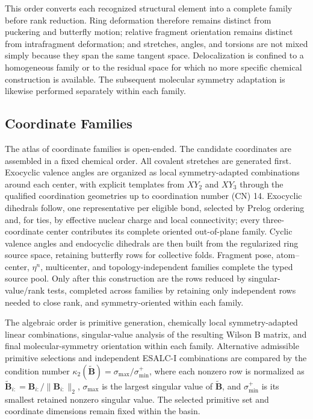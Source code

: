 \documentclass[journal=jctcce,manuscript=article,layout=traditional]{achemso}
\newcommand{\Bmat}{\mathbf{B}}
\theoremstyle{definition}
\begin{document}
This order converts each recognized structural element into a complete family
before rank reduction.  Ring deformation therefore remains distinct from
puckering and butterfly motion; relative fragment orientation remains distinct
from intrafragment deformation; and stretches, angles, and torsions are not
mixed simply because they span the same tangent space.  Delocalization is
confined to a homogeneous family or to the residual space for which no more
specific chemical construction is available.  The subsequent molecular
symmetry adaptation is likewise performed separately within each family.

\subsection{Coordinate Families}

The atlas of coordinate families is open-ended.
The candidate coordinates are assembled in a fixed chemical order.  All covalent
{stretches} are generated first.  Exocyclic valence angles are organized as
local symmetry-adapted combinations around each center, with explicit
templates from \(XY_2\) and \(XY_3\) through the qualified coordination
geometries up to coordination number (CN) 14.\cite{ZouTaoKraka2020Polytopal}  Exocyclic dihedrals follow, one representative per
eligible bond, selected by Prelog ordering and, for ties, by effective nuclear
charge and local connectivity; every three-coordinate center contributes its
complete oriented out-of-plane family.  Cyclic valence angles and endocyclic
dihedrals are then built from the regularized ring source space, retaining
butterfly rows for collective folds.  Fragment pose, atom--center, \(\eta^n\), multicenter, and
topology-independent families complete the typed source pool.  Only after this
construction are the rows reduced by singular-value/rank tests, completed
across families by retaining only independent rows needed to close rank, and
symmetry-oriented within each family.

{The algebraic order is primitive generation, chemically local
symmetry-adapted linear combinations, singular-value analysis of the resulting
Wilson B matrix, and final molecular-symmetry orientation within each family.
Alternative admissible primitive selections and independent ESALC-I combinations
are compared by the condition number
\(\kappa_2(\widetilde{\Bmat})=\sigma_{\max}/\sigma_{\min}^{+}\),
where each nonzero row is normalized as
\(\widetilde{\Bmat}_{i:}=\Bmat_{i:}/\|\Bmat_{i:}\|_2\),
\(\sigma_{\max}\) is the largest singular value of \(\widetilde{\Bmat}\),
and \(\sigma_{\min}^{+}\) is its smallest retained nonzero singular value.
The selected primitive set and coordinate dimensions remain fixed within the
basin.}
\end{document}

